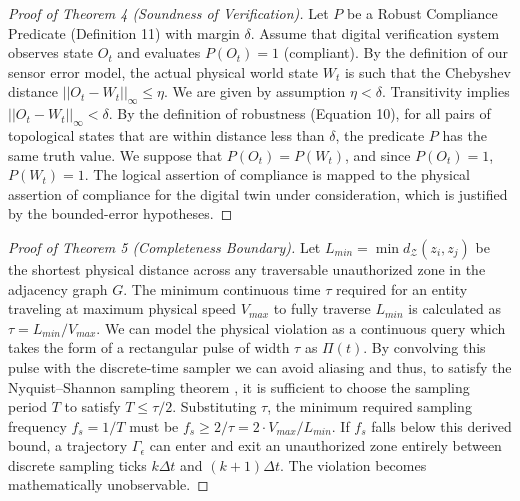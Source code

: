 \documentclass[conference]{IEEEtran}
\newcommand{\Z}{\mathcal{Z}} %
\newcommand{\Tr}{\Gamma} %
\begin{document}
\begin{proof}[Proof of Theorem 4 (Soundness of Verification)]
Let $P$ be a Robust Compliance Predicate (Definition 11) with margin $\delta$. Assume that digital verification system observes state $O_t$ and evaluates $P(O_t) = 1$ (compliant). By the definition of our sensor error model, the actual physical world state $W_t$ is such that the Chebyshev distance $||O_t - W_t||_\infty \le \eta$. We are given by assumption $\eta < \delta$. Transitivity implies $||O_t - W_t||_\infty < \delta$. By the definition of robustness (Equation 10), for all pairs of topological states that are within distance less than $\delta$, the predicate $P$ has the same truth value. We suppose that $P(O_t) = P(W_t)$, and since $P(O_t) = 1$, $P(W_t) = 1$. The logical assertion of compliance is mapped to the physical assertion of compliance for the digital twin under consideration, which is justified by the bounded-error hypotheses.
\end{proof}

\begin{proof}[Proof of Theorem 5 (Completeness Boundary)]
Let $L_{min} = \min d_\Z(z_i, z_j)$ be the shortest physical distance across any traversable unauthorized zone in the adjacency graph $G$. The minimum continuous time $\tau$ required for an entity traveling at maximum physical speed $V_{max}$ to fully traverse $L_{min}$ is calculated as $\tau = L_{min} / V_{max}$. We can model the physical violation as a continuous query which takes the form of a rectangular pulse of width $\tau$ as $\Pi(t)$. By convolving this pulse with the discrete-time sampler we can avoid aliasing and thus, to satisfy the Nyquist–Shannon sampling theorem \cite{b4}, it is sufficient to choose the sampling period $T$ to satisfy $T \le \tau / 2$. Substituting $\tau$, the minimum required sampling frequency $f_s = 1/T$ must be $f_s \ge 2 / \tau = 2 \cdot V_{max} / L_{min}$. If $f_s$ falls below this derived bound, a trajectory $\Tr_\epsilon$ can enter and exit an unauthorized zone entirely between discrete sampling ticks $k\Delta t$ and $(k+1)\Delta t$. The violation becomes mathematically unobservable.
\end{proof}
\end{document}
